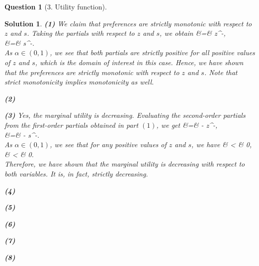 \documentclass{article} %
\def\eQb#1\eQe{\begin{eqnarray*}#1\end{eqnarray*}}
\theoremstyle{quest}
\newtheorem*{question}{Question}
\newtheorem*{solution}{Solution}
\begin{document}
\begin{question}[3. Utility function]
\end{question}
\begin{solution}
\textbf{(1)} We claim that preferences are strictly monotonic with respect to $z$ and $s$.
Taking the partials with respect to $z$ and $s$, we obtain
\eQb
\dfrac{\partial U}{\partial z} &=&  z^{-}, \\
 &=&  s^{-}. \\
\eQe
As $\alpha \in (0,1)$, we see that both partials are strictly positive for all positive
values of $z$ and $s$, which is the domain of interest in this case. Hence, we have shown
that the preferences are strictly monotonic with respect to $z$ and $s$. Note 
that strict monotonicity implies monotonicity as well.

\smallskip

\textbf{(2)} 

\smallskip

\textbf{(3)} 
Yes, the marginal utility is decreasing. Evaluating the second-order partials
from the first-order partials obtained in part $(1)$, we get
\eQb
\dfrac{\partial^2 U}{\partial z^2} &=& - z^{-}, \\
 &=& - s^{-}. \\
\eQe
As $\alpha \in (0,1)$, we see that for any positive values of $z$ and $s$, we have 
\eQb
\dfrac{\partial^2 U}{\partial z^2} & < & 0, \\
 & < & 0. \\
\eQe
Therefore, we have shown that the marginal utility is decreasing with 
respect to both variables. It is, in fact,
strictly decreasing.

\smallskip

\textbf{(4)}

\smallskip

\textbf{(5)}

\smallskip

\textbf{(6)}

\smallskip

\textbf{(7)}

\smallskip

\textbf{(8)}


\end{solution}
\end{document}

